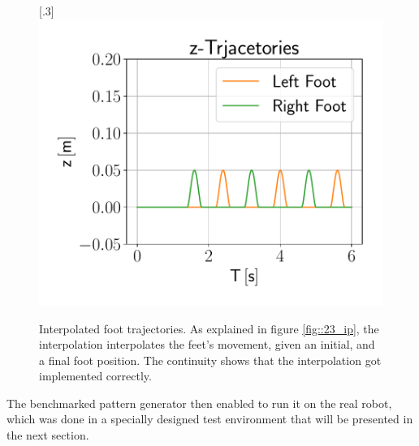 \begin{figure}[h!]
	[.3\linewidth]{\includegraphics[scale=.3]{chapters/09_user_controlled_walking_experiments/img/01_benchmarking/interpolated_z_trajectories.pdf}}
	\caption{Interpolated foot trajectories. As explained in figure \ref{fig::23_ip}, the interpolation interpolates the feet's movement, given an initial, and a final foot position. The continuity shows that the interpolation got implemented correctly.}
	\label{fig::91_benchmarking_inter}
\end{figure}
The benchmarked pattern generator then enabled to run it on the real robot, which was done in a specially designed test environment that will be presented in the next section.

\FloatBarrier
